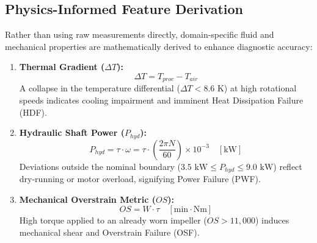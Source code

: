 \documentclass[11pt,a4paper]{article}
\begin{document}
\subsection{Physics-Informed Feature Derivation}
Rather than using raw measurements directly, domain-specific fluid and mechanical properties are mathematically derived to enhance diagnostic accuracy:
\begin{enumerate}
    \item \textbf{Thermal Gradient ($\Delta T$):}
    \begin{equation}
        \Delta T = T_{proc} - T_{air}
    \end{equation}
    A collapse in the temperature differential ($\Delta T < 8.6\text{ K}$) at high rotational speeds indicates cooling impairment and imminent Heat Dissipation Failure (HDF).

    \item \textbf{Hydraulic Shaft Power ($P_{hyd}$):}
    \begin{equation}
        P_{hyd} = \tau \cdot \omega = \tau \cdot \left( \frac{2 \pi N}{60} \right) \times 10^{-3} \quad [\text{kW}]
    \end{equation}
    Deviations outside the nominal boundary ($3.5\text{ kW} \le P_{hyd} \le 9.0\text{ kW}$) reflect dry-running or motor overload, signifying Power Failure (PWF).

    \item \textbf{Mechanical Overstrain Metric ($OS$):}
    \begin{equation}
        OS = W \cdot \tau \quad [\text{min}\cdot\text{Nm}]
    \end{equation}
    High torque applied to an already worn impeller ($OS > 11,000$) induces mechanical shear and Overstrain Failure (OSF).
\end{enumerate}
\end{document}
